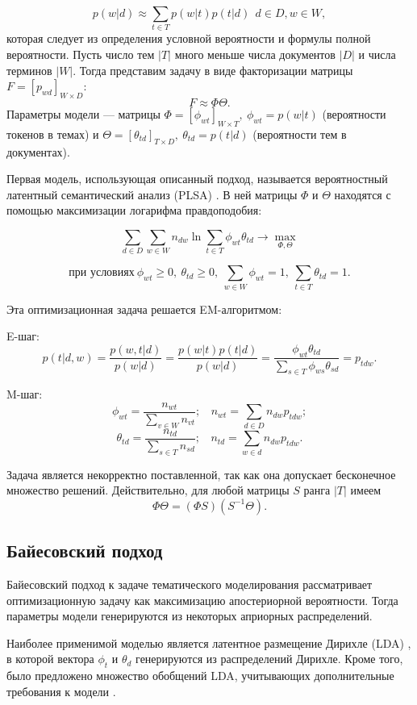 $$p(w|d) \approx \sum\limits_{t \in T}  p(w|t)p(t|d) \ \ d\in D, w \in W,
$$
которая следует из определения условной вероятности и формулы полной вероятности.
Пусть число тем $|T|$ много меньше числа документов $|D|$ и числа терминов $|W|$. Тогда представим задачу в виде факторизации матрицы $F =[p_{wd}]_{W \times D} $: $$F \approx \Phi \Theta.$$
Параметры модели --- матрицы $\Phi = [\phi_{wt}]_{W \times T}, \ \phi_{wt}=p(w|t)$ (вероятности токенов в темах) и $\Theta = [\theta_{td}]_{T \times D}, \ \theta_{td}=p(t|d)$ (вероятности тем в документах). 

Первая модель, использующая описанный подход, называется вероятностный латентный семантический анализ (PLSA) \cite{PLSA}. В ней матрицы $\Phi$ и $\Theta$ находятся с помощью максимизации логарифма правдоподобия: 
	
	$$\sum\limits_{d \in D} \sum\limits_{w \in W} n_{dw} \ln{\sum\limits_{t \in T} \phi_{wt}\theta_{td}} \rightarrow 
	\max\limits_{\Phi, \Theta} $$
	
	$$ \text{при условиях}  \ \phi_{wt} \geq 0, \ \theta_{td} \geq 0,\ \sum\limits_{w \in W} \phi_{wt} = 1, \ \sum\limits_{t \in T} \theta_{td} = 1.$$
		
Эта оптимизационная задача решается EM-алгоритмом:

E-шаг: $$p(t|d, w) = \dfrac{p(w, t| d)}{p(w|d)} = \dfrac{p(w|t)p(t|d)}{p(w|d)} =\dfrac{\phi_{wt}\theta_{td}}{\sum\limits_{s\in T}\phi_{ws}\theta_{sd}}= p_{tdw}.$$

M-шаг: $$\phi_{wt} = \dfrac{n_{wt}}{\sum\limits_{v \in W}n_{vt}}; \ \  \ \ n_{wt} = \sum\limits_{d \in D} n_{dw} p_{tdw};$$
	$$ \theta_{td} = \dfrac{n_{td}}{\sum\limits_{s \in T}n_{sd}}; \ \  \ \ n_{td} = \sum\limits_{w \in d} n_{dw} p_{tdw}.$$

Задача является некорректно поставленной, так как она допускает бесконечное множество решений. Действительно, для любой матрицы $S$ ранга $|T|$ имеем $$\Phi \Theta = (\Phi S)(S^{-1}\Theta).$$

\subsection{Байесовский подход}
Байесовский подход к задаче тематического моделирования рассматривает оптимизационную задачу как максимизацию апостериорной вероятности. Тогда параметры модели генерируются из некоторых априорных распределений.

 Наиболее применимой моделью является латентное размещение Дирихле (LDA) \cite{LDA}, в которой вектора $\phi_t$ и $\theta_d$ генерируются из распределений Дирихле. Кроме того, было предложено множество обобщений LDA, учитывающих дополнительные требования к модели \cite{Chemudugunta2006, Rosen-Zvi2004, Than2012}.
 
